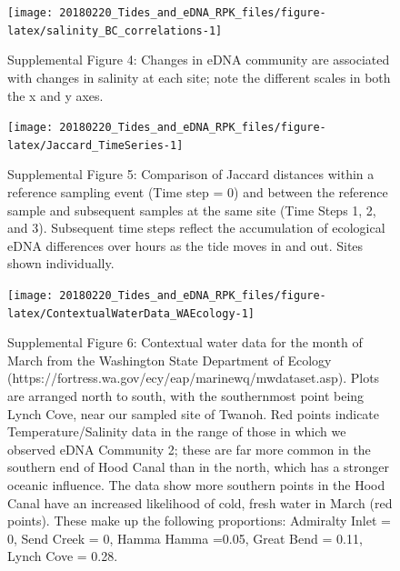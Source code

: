 \documentclass[fleqn,10pt]{wlpeerj}
\begin{document}
\begin{figure}[!ht]

{\centering \texttt{[image: 20180220\_Tides\_and\_eDNA\_RPK\_files/figure-latex/salinity\_BC\_correlations-1]} 

}

\caption*{\label{fig:SupplFig4}Supplemental Figure 4: Changes in eDNA community are associated with changes in salinity at each site; note the different scales in both the x and y axes.}\label{fig:salinity_BC_correlations}
\end{figure}

\begin{figure}[!ht]

{\centering \texttt{[image: 20180220\_Tides\_and\_eDNA\_RPK\_files/figure-latex/Jaccard\_TimeSeries-1]} 

}

\caption*{\label{fig:SuppFig5}Supplemental Figure 5:  Comparison of Jaccard distances within a reference sampling event (Time step = 0) and between the reference sample and subsequent samples at the same site (Time Steps 1, 2, and 3). Subsequent time steps reflect the accumulation of ecological eDNA differences over hours as the tide moves in and out. Sites shown individually.}\label{fig:Jaccard_TimeSeries}
\end{figure}

\begin{figure}[!ht]

{\centering \texttt{[image: 20180220\_Tides\_and\_eDNA\_RPK\_files/figure-latex/ContextualWaterData\_WAEcology-1]} 

}

\caption*{\label{fig:SupplementalWaterChem}Supplemental Figure 6: Contextual water data for the month of March from the Washington State Department of Ecology (https://fortress.wa.gov/ecy/eap/marinewq/mwdataset.asp). Plots are arranged north to south, with the southernmost point being Lynch Cove, near our sampled site of Twanoh. Red points indicate Temperature/Salinity data in the range of those in which we observed eDNA Community 2; these are far more common in the southern end of Hood Canal than in the north, which has a stronger oceanic influence. The data show more southern points in the Hood Canal have an increased likelihood of cold, fresh water in March (red points). These make up the following proportions: Admiralty Inlet = 0, Send Creek = 0, Hamma Hamma =0.05, Great Bend = 0.11, Lynch Cove = 0.28.}\label{fig:ContextualWaterData_WAEcology}
\end{figure}
\end{document}
